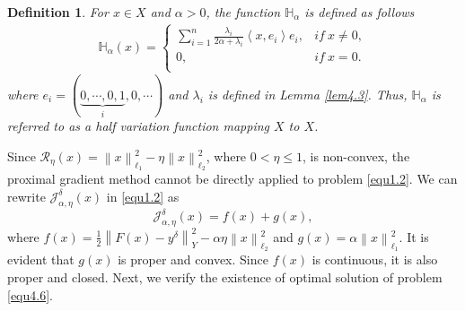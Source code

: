 \documentclass[a4paper,12pt]{article}
\newtheorem{definition}[theorem]{Definition}
\numberwithin{equation}{section}
\begin{document}
\begin{definition}\label{def4.4}
    For $x\in X$ and $\alpha>0$, the function $\mathbb{H}_{\alpha}$ is defined as follows
\begin{align}\label{equ4.5}
    \mathbb{H}_{\alpha}(x)=
    \left\{             
             \begin{array}{ll}
             \sum_{i=1}^{n}\frac{\lambda_{i}}{2\alpha+\lambda_{i}}\left<x, e_{i}\right>e_{i}, & if \ x\neq 0, \\
             0, & if \ x= 0. \\
             \end{array}
    \right.
\end{align}
where $e_{i}=(\underbrace{0,\cdots,0,1}_{i},0,\cdots)$ and $\lambda_{i}$ is defined in Lemma \ref{lem4.3}. Thus, $\mathbb{H}_{\alpha}$ is referred to as a half variation function mapping $X$ to $X$.
\end{definition}

\par Since $\mathcal{R}_{\eta}\left(x\right)=\left\|x\right\|_{\ell_{1}}^{2}- \eta\left\|x\right\|_{\ell_{2}}^{2}$, where $0<\eta\leq 1$, is non-convex, the proximal gradient method cannot be directly applied to problem \eqref{equ1.2}. We can rewrite $\mathcal{J}_{\alpha,\eta}^{\delta}\left(x\right)$ in \eqref{equ1.2} as 
\begin{equation}\label{equ4.6}
    \mathcal{J}_{\alpha,\eta}^{\delta}\left(x\right)=f\left(x\right)+g\left(x\right),
\end{equation}
where $f\left(x\right)=\frac{1}{2}\left\|F(x)-y^{\delta}\right\|_{Y}^{2} -\alpha\eta\left\|x\right\|_{\ell_{2}}^{2}$ and $g\left(x\right)=\alpha\left\|x\right\|_{\ell_{1}}^{2}$. It is evident that $g\left(x\right)$ is proper and convex. Since $f\left(x\right)$ is continuous, it is also proper and closed. Next, we verify the existence of optimal solution of problem \eqref{equ4.6}.
\end{document}
